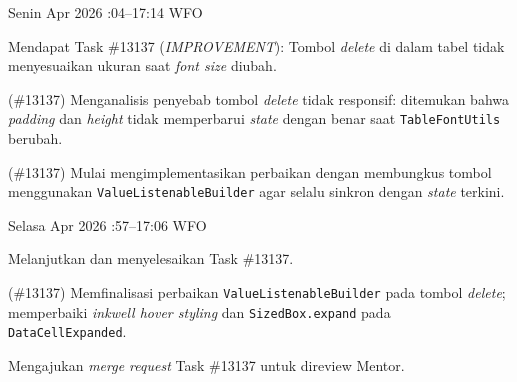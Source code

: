 \begin{logtable}

    {
        Senin  Apr 2026 :04--17:14 \linebreak %
        WFO
    }{
        \begin{loglist}
            \item Mendapat Task \#13137 (\textit{IMPROVEMENT}): Tombol \textit{delete} di dalam
            tabel tidak menyesuaikan ukuran saat \textit{font size} diubah.
        \end{loglist}
    }{
        \begin{logwork}
            \item (\#13137) Menganalisis penyebab tombol \textit{delete} tidak responsif: ditemukan bahwa \textit{padding} dan \textit{height} tidak memperbarui \textit{state} dengan benar saat \texttt{TableFontUtils} berubah.
            \item (\#13137) Mulai mengimplementasikan perbaikan dengan membungkus tombol menggunakan \texttt{ValueListenableBuilder} agar selalu sinkron dengan \textit{state} terkini.
        \end{logwork}
    }

    {
        Selasa  Apr 2026 :57--17:06 \linebreak %
        WFO
    }{
        \begin{loglist}
            \item Melanjutkan dan menyelesaikan Task \#13137.
        \end{loglist}
    }{
        \begin{logwork}
            \item (\#13137) Memfinalisasi perbaikan \texttt{ValueListenableBuilder} pada tombol \textit{delete}; memperbaiki \textit{inkwell hover styling} dan \texttt{SizedBox.expand} pada \texttt{DataCellExpanded}.
            \item Mengajukan \textit{merge request} Task \#13137 untuk direview Mentor.
        \end{logwork}
    }


\end{logtable}
